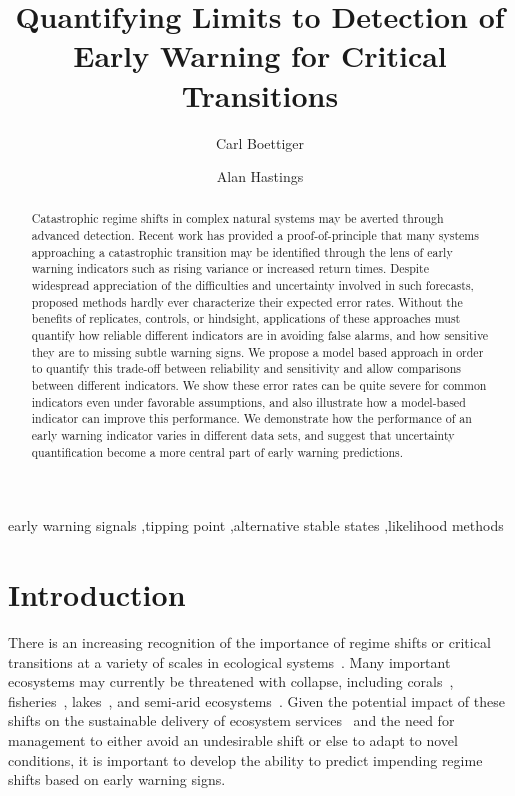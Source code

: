 \documentclass[authoryear,review,11pt]{elsarticle}
\begin{document}
\begin{frontmatter}
  \title{Quantifying Limits to Detection of Early Warning for Critical Transitions}
  \author[cpb]{Carl Boettiger}
  \author[esp]{Alan Hastings}
  \address[cpb]{Center for Population Biology, 1 Shields Avenue, University of California, Davis, CA, 95616 United States.}
  \address[esp]{Department of Environmental Science and Policy, University of California, Davis}


  \begin{abstract}

Catastrophic regime shifts in complex natural systems may be averted through advanced detection.
Recent work has provided a proof-of-principle that many systems approaching a catastrophic transition may be identified
through the lens of early warning indicators such as rising variance or increased return times.
Despite widespread appreciation of the difficulties and uncertainty involved in such forecasts,
proposed methods hardly ever characterize their expected error rates. 
Without the benefits of replicates, controls, or hindsight, 
applications of these approaches must quantify how reliable different indicators are in avoiding false alarms,
and how sensitive they are to missing subtle warning signs.
We propose a model based approach in order to quantify this trade-off between reliability and sensitivity
and allow comparisons between different indicators.
We show these error rates can be quite severe for common indicators even under favorable assumptions,
and also illustrate how a model-based indicator can improve this performance. 
We demonstrate how the performance of an early warning indicator varies in different data sets, 
and suggest that uncertainty quantification become a more central part of early warning predictions.  
  \end{abstract}

  \begin{keyword}
early warning signals \sep tipping point \sep alternative stable states \sep likelihood methods
   \end{keyword}
 \end{frontmatter}

\section{Introduction}
There is an increasing recognition of the importance of regime shifts or critical transitions at a variety of scales in ecological systems~\citep{Holling1973, Wissel1984, Scheffer2001, Scheffer2009, Drake2010, Carpenter2011}⁠.
Many important ecosystems may currently be threatened with collapse, including corals~\citep{Bellwood2004}, fisheries~\citep{Berkes2006}⁠, lakes~\citep{Carpenter2011}, and semi-arid ecosystems~\citep{Kefi2007}⁠.
Given the potential impact of  these shifts on the sustainable delivery of ecosystem services~\citep{Folke2004}
and the need for management to either avoid an undesirable shift or else to adapt to novel conditions,
it is important to develop the ability to predict impending regime shifts based on early warning signs.
\end{document}
